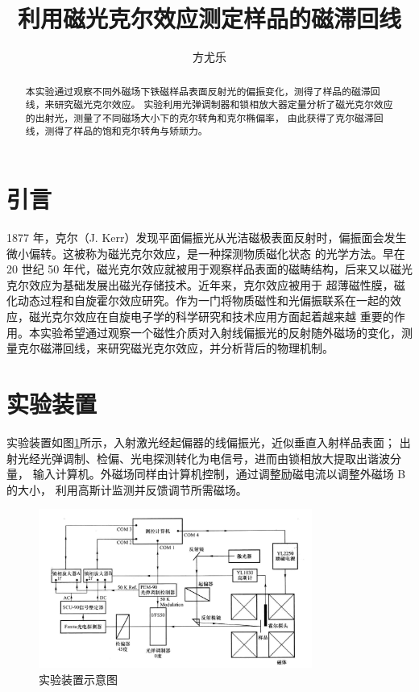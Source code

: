 \documentclass[revtex4-2]{mpltx}
\begin{document}
\title{利用磁光克尔效应测定样品的磁滞回线}
\author{方尤乐}

\begin{abstract}
    本实验通过观察不同外磁场下铁磁样品表面反射光的偏振变化，测得了样品的磁滞回线，来研究磁光克尔效应。
    实验利用光弹调制器和锁相放大器定量分析了磁光克尔效应的出射光，测量了不同磁场大小下的克尔转角和克尔椭偏率，
    由此获得了克尔磁滞回线，测得了样品的饱和克尔转角与矫顽力。
\end{abstract}
\maketitle
\section{引言}
    1877 年，克尔（J. Kerr）发现平面偏振光从光洁磁极表面反射时，偏振面会发生微小偏转。这被称为磁光克尔效应，是一种探测物质磁化状态
    的光学方法。早在 20 世纪 50 年代，磁光克尔效应就被用于观察样品表面的磁畴结构，后来又以磁光克尔效应为基础发展出磁光存储技术。近年来，克尔效应被用于
    超薄磁性膜，磁化动态过程和自旋霍尔效应研究。作为一门将物质磁性和光偏振联系在一起的效应，磁光克尔效应在自旋电子学的科学研究和技术应用方面起着越来越
    重要的作用。本实验希望通过观察一个磁性介质对入射线偏振光的反射随外磁场的变化，测量克尔磁滞回线，来研究磁光克尔效应，并分析背后的物理机制。
\section{实验装置}
    实验装置如图\ref{fig:1}所示，入射激光经起偏器的线偏振光，近似垂直入射样品表面；
    出射光经光弹调制、检偏、光电探测转化为电信号，进而由锁相放大提取出谐波分量，
    输入计算机。外磁场同样由计算机控制，通过调整励磁电流以调整外磁场 B 的大小，
    利用高斯计监测并反馈调节所需磁场。
    \begin{figure}[htbp]
        \centering
        \includegraphics[width=0.8\textwidth]{./1.png}
        \caption{实验装置示意图}\label{fig:1}
    \end{figure}
\end{document}
